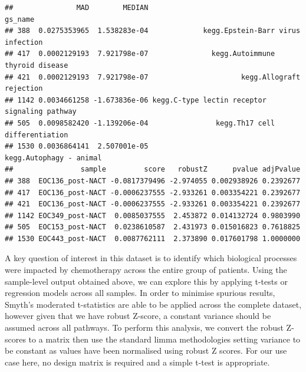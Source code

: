 \documentclass[9pt,a4paper,]{extarticle}
\begin{document}
\begin{verbatim}
##               MAD        MEDIAN                                       gs_name
## 388  0.0275353965  1.538283e-04             kegg.Epstein-Barr virus infection
## 417  0.0002129193  7.921798e-07               kegg.Autoimmune thyroid disease
## 421  0.0002129193  7.921798e-07                      kegg.Allograft rejection
## 1142 0.0034661258 -1.673836e-06 kegg.C-type lectin receptor signaling pathway
## 505  0.0098582420 -1.139206e-04                kegg.Th17 cell differentiation
## 1530 0.0036864141  2.507001e-05                       kegg.Autophagy - animal
##                sample         score   robustZ      pvalue adjPvalue
## 388  EOC136_post-NACT -0.0817379496 -2.974055 0.002938926 0.2392677
## 417  EOC136_post-NACT -0.0006237555 -2.933261 0.003354221 0.2392677
## 421  EOC136_post-NACT -0.0006237555 -2.933261 0.003354221 0.2392677
## 1142 EOC349_post-NACT  0.0085037555  2.453872 0.014132724 0.9803990
## 505  EOC153_post-NACT  0.0238610587  2.431973 0.015016823 0.7618825
## 1530 EOC443_post-NACT  0.0087762111  2.373890 0.017601798 1.0000000
\end{verbatim}

A key question of interest in this dataset is to identify which biological processes were impacted by chemotherapy across the entire group of patients.
Using the sample-level output obtained above, we can explore this by applying t-tests or regression models across all samples.
In order to minimise spurious results, Smyth's moderated t-statistics\citep{Smyth_2004} are able to be applied across the complete dataset, however given that we have robust Z-score, a constant variance should be assumed across all pathways.
To perform this analysis, we convert the robust Z-scores to a matrix then use the standard limma methodologies setting variance to be constant as values have been normalised using robust Z scores.
For our use case here, no design matrix is required and a simple t-test is appropriate.
\end{document}
